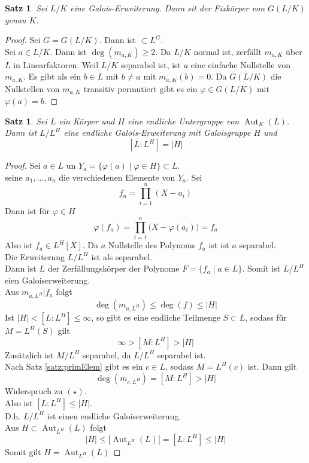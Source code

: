 \documentclass[10pt,a4paper]{article}
\newcommand{\abs}[1]{\left|#1\right|}
\newcommand{\Aut}{\operatorname{Aut}}
\theoremstyle{plain}
\newtheorem{satz}[theorem]{Satz}
\theoremstyle{definition}
\theoremstyle{remark}
\begin{document}
	\begin{satz}
		Sei $L/K$ eine Galois-Erweiterung. Dann sit der Fixkörper von $G(L/K)$ genau $K$.
	\end{satz}
	\begin{proof}
		Sei $G=G(L/K)$. Dann ist $\subset L^G$.\\
		Sei $a\in L/K$. Dann ist $\deg(m_{a,K})\geq 2$. Da $L/K$ normal ist, zerfällt $m_{a,K}$ über $L$ in Linearfaktoren. Weil $L/K$ separabel ist, ist $a$ eine einfache Nullstelle von $m_{a,K}$. Es gibt als ein $b\in L$ mit $b\neq a$ mit $m_{a,K}(b)=0$. Da $G(L/K)$ die Nullstellen von $m_{a,K}$ transitiv permutiert gibt es ein $\varphi\in G(L/K)$ mit $\varphi(a)=b$.
	\end{proof}

	\begin{satz}
		Sei $L$ ein Körper und $H$ eine endliche Untergruppe von $\Aut_K(L)$. Dann ist $L/L^H$ eine endliche Galois-Erweiterung mit Galoisgruppe $H$ und
		\[[L:L^H]=\abs{H}\]
	\end{satz}
	\begin{proof}
		Sei $a\in L$ un $Y_a=\{\varphi(a)\mid\varphi\in H\}\subset L$.\\
		seine $a_1,...,a_n$ die verschiedenen Elemente von $Y_a$. Sei
		\[f_a=\prod_{i=1}^{n}(X-a_i)\]
		Dann ist für $\varphi\in H$ 
		\[\varphi(f_a)=\prod_{i=1}^{n}\big(X-\varphi(a_i)\big)=f_a\]
		Also ist $f_a\in L^H[X]$. Da $a$ Nullstelle des Polynoms $f_a$ ist ist $a$ separabel.\\
		Die Erweiterung $L/L^H$ ist als separabel.\\
		Dann ist $L$ der Zerfällungskörper der Polynome $F=\{f_a\mid a\in L\}$. Somit ist $L/L^H$ eien Galoiserweiterung.\\
		Aus $m_{a,L^H}| f_a$ folgt 
		\[\deg(m_{a,L^H})\leq \deg(f)\leq \abs{H}\tag{\star}\]
		Ist $\abs{H}<[L:L^H]\leq\infty$, so gibt es eine endliche Teilmenge $S\subset L$, sodass für $M=L^H(S)$ gilt
		\[\infty>[M:L^H]>\abs H\]
		Zusätzlich ist $M/L^H$ separabel, da $L/L^H$ separabel ist.\\
		Nach Satz \ref{satz:primElem} gibt es ein $c\in L$, sodass $M=L^H(c)$ ist. Dann gilt
		\[\deg(m_{c,L^H})=[M:L^H]>\abs{H}\]
		Widerspruch zu $(\star)$.\\
		Also ist $[L:L^H]\leq\abs H$.\\
		D.h. $L/L^H$ ist einen endliche Galoiserweiterung.\\
		Aus $H\subset \Aut_{L^H}(L)$ folgt
		\[\abs H\leq\abs{\Aut_{L^H}(L)}=[L:L^H]\leq\abs{H}\]
		Somit gilt $H=\Aut_{L^H}(L)$
	\end{proof}
\end{document}
